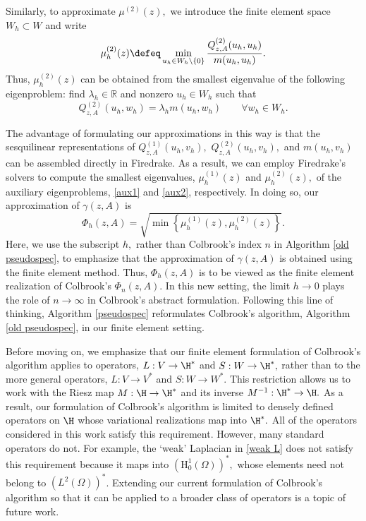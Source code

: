 Similarly, to approximate $\mu^{(2)}(z),$ we introduce the finite element space $W_h \subset W$ and write
\begin{equation}
    \mu_h^{(2)}(z) \defeq \min_{u_h \in W_h\setminus\{0\}} \frac{Q_{z, A}^{(2)}(u_h, u_h)}{m(u_h, u_h)}.
\end{equation} 
Thus, $\mu_h^{(2)}(z)$ can be obtained from the smallest eigenvalue of the following eigenproblem: find $\lambda_h \in \mathbb{R}$ and nonzero $u_h \in W_h$ such that 
\begin{equation} \label{aux2}
    Q_{z, A}^{(2)}(u_h, w_h) = \lambda_h m(u_h, w_h) \qquad \forall w_h \in W_h.
\end{equation}

The advantage of formulating our approximations in this way is that the sesquilinear representations of 
$Q_{z, A}^{(1)}(u_h, v_h),$  $Q_{z, A}^{(2)}(u_h, v_h),$ and $m(u_h, v_h)$ can be assembled directly in Firedrake. As a result, we can employ Firedrake's solvers to compute the smallest eigenvalues, $\mu_h^{(1)}(z)$ and $\mu_h^{(2)}(z),$ of the auxiliary eigenproblems, \eqref{aux1} and \eqref{aux2}, respectively. In doing so, our approximation of $\gamma(z, A)$ is
\begin{equation} \label{approx phi}
    \Phi_h(z, A) = \sqrt{ \min \left\{ \mu_h^{(1)}(z), \mu_h^{(2)}(z) \right\} }.
\end{equation}
Here, we use the subscript $h,$ rather than Colbrook's index $n$ in Algorithm \ref{old pseudospec}, to emphasize that the approximation of $\gamma(z, A)$ is obtained using the finite element method. Thus, $\Phi_h(z, A)$ is to be viewed as the finite element realization of Colbrook's $\Phi_n(z, A).$ In this new setting, the limit $h \rightarrow 0$ plays the role of $n \rightarrow \infty$ in Colbrook's abstract formulation.
Following this line of thinking, Algorithm \ref{pseudospec} reformulates Colbrook's algorithm, Algorithm \ref{old pseudospec}, in our finite element setting.



Before moving on, we emphasize that our finite element formulation of Colbrook's algorithm applies to operators, $L : V \rightarrow \H^*$ and $S: W \rightarrow \H^*,$ rather than to the more general operators, $L:V \rightarrow V^*$ and $S:W\rightarrow W^*.$ This restriction allows us to work with the Riesz map $M : \H \rightarrow \H^*$ and its inverse $M^{-1}:\H^* \rightarrow \H.$  As a result, our formulation of Colbrook's algorithm is limited to densely defined operators on $\H$ whose variational realizations map into $\H^*.$ All of the operators considered in this work satisfy this requirement. However, many standard operators do not. For example, the `weak' Laplacian in \eqref{weak L} does not satisfy this requirement because it maps into $(\text{H}_0^1(\Omega))^*,$ whose elements need not belong to $(L^2(\Omega))^*$. Extending our current formulation of Colbrook's algorithm so that it can be applied to a broader class of operators is a topic of future work.




